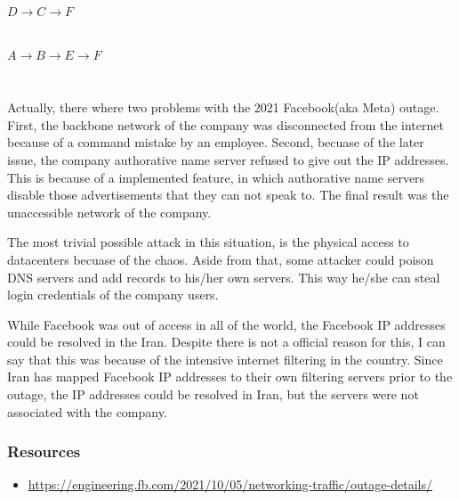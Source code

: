 \documentclass[en]{university}
\begin{document}
\subsection{}
$D \rightarrow C \rightarrow F$

\subsection{}
$A \rightarrow B \rightarrow E \rightarrow F$

\section{}
Actually, there where two problems with the 2021 Facebook(aka Meta) outage. First, the backbone network of the company was disconnected from the internet because of a command mistake by an employee. Second, becuase of the later issue, the company authorative name server refused to give out the IP addresses. This is because of a implemented feature, in which authorative name servers disable those advertisements that they can not speak to. The final result was the unaccessible network of the company.

The most trivial possible attack in this situation, is the physical access to datacenters becuase of the chaos. Aside from that, some attacker could poison DNS servers and add records to his/her own servers. This way he/she can steal login credentials of the company users.

While Facebook was out of access in all of the world, the Facebook IP addresses could be resolved in the Iran. Despite there is not a official reason for this, I can say that this was because of the intensive internet filtering in the country. Since Iran has mapped Facebook IP addresses to their own filtering servers prior to the outage, the IP addresses could be resolved in Iran, but the servers were not associated with the company.

\subsubsection*{Resources}
\begin{itemize}
    \item \href{https://engineering.fb.com/2021/10/05/networking-traffic/outage-details/}{\url{https://engineering.fb.com/2021/10/05/networking-traffic/outage-details/}}
\end{itemize}
\end{document}
